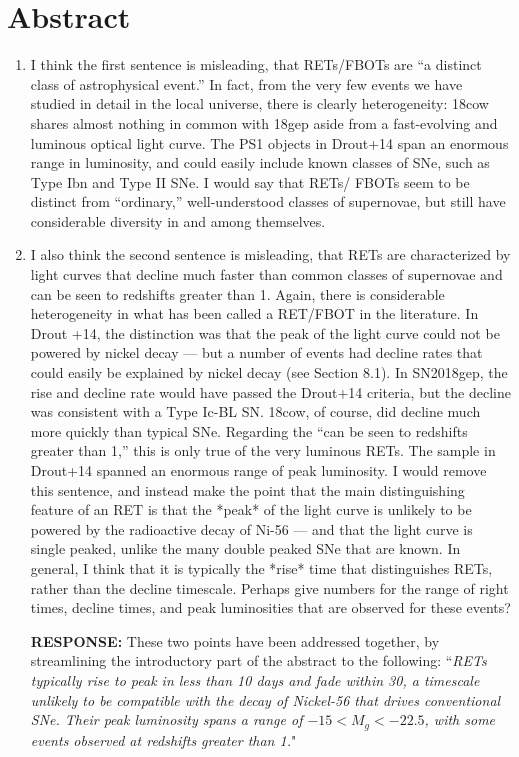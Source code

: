 \documentclass{article}
\begin{document}
\section*{Abstract}
\begin{enumerate}

\item I think the first sentence is misleading, that RETs/FBOTs are “a distinct class of astrophysical event.”
In fact, from the very few events we have studied in detail in the local universe, there is clearly heterogeneity: 18cow shares almost nothing in common with 18gep aside from a fast-evolving and luminous optical light curve. The PS1 objects in Drout+14 span an enormous range in luminosity, and could easily include known classes of SNe, such as Type Ibn and Type II SNe. I would say that RETs/ FBOTs seem to be distinct from “ordinary,” well-understood classes of supernovae, but still have considerable diversity in and among themselves.

\item I also think the second sentence is misleading, that RETs are characterized by light curves that decline much faster than common classes of supernovae and can be seen to redshifts greater than 1. Again, there is considerable heterogeneity in what has been called a RET/FBOT in the literature. In Drout +14, the distinction was that the peak of the light curve could not be powered by nickel decay — but a number of events had decline rates that could easily be explained by nickel decay (see Section 8.1). In SN2018gep, the rise and decline rate would have passed the Drout+14 criteria, but the decline was consistent with a Type Ic-BL SN. 18cow, of course, did decline much more quickly than typical SNe. Regarding the “can be seen to redshifts greater than 1,” this is only true of the very luminous RETs. The sample in Drout+14 spanned an enormous range of peak luminosity. I would remove this sentence, and instead make the point that the main distinguishing feature of an RET is that the *peak* of the light curve is unlikely to be powered by the radioactive decay of Ni-56 — and that the light curve is single peaked, unlike the many double peaked SNe that are known. In general, I think that it is typically the *rise* time that distinguishes RETs, rather than the decline timescale. Perhaps give numbers for the range of right times, decline times, and peak luminosities that are observed for these events?

\vskip0.1cm
{\bf RESPONSE: } These two points have been addressed together, by streamlining the introductory part of the abstract to the following: ``\textit{RETs typically rise to peak in less than 10 days and fade within 30, a timescale unlikely to be compatible with the decay of Nickel-56 that drives conventional SNe. Their peak luminosity spans a range of $-15<M_g<-22.5$, with some events observed at redshifts greater than 1.}"


\end{enumerate}
\end{document}
